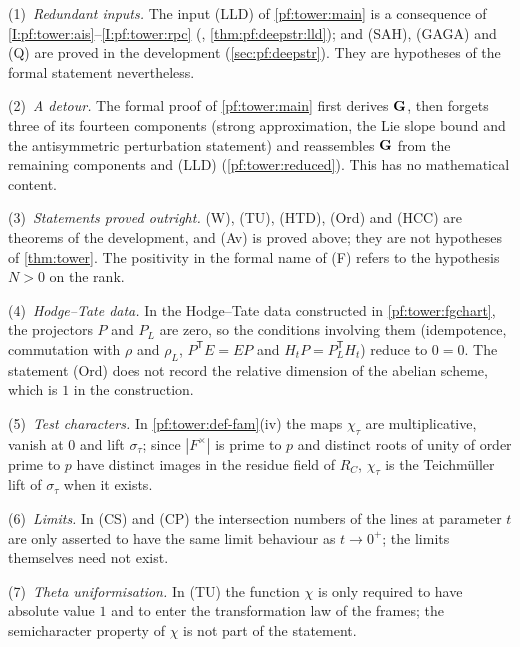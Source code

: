 \begin{remark}\label{pf:tower:rem-formal}
(1)~\emph{Redundant inputs.} The input (LLD) of \cref{pf:tower:main} is a consequence of \ref{I:pf:tower:ais}--\ref{I:pf:tower:rpc}
(, \cref{thm:pf:deepstr:lld}); and (SAH), (GAGA) and (Q)
are proved in the development (\cref{sec:pf:deepstr}). They are hypotheses of the formal statement nevertheless.

(2)~\emph{A detour.} The formal proof of \cref{pf:tower:main} first derives $\mathbf G$, then forgets three of its fourteen components
(strong approximation, the Lie slope bound and the antisymmetric perturbation statement) and reassembles $\mathbf G$ from the
remaining components and (LLD) (\cref{pf:tower:reduced}). This has no mathematical content.

(3)~\emph{Statements proved outright.} (W), (TU), (HTD), (Ord) and (HCC) are theorems of the development, and (Av) is proved
above; they are not hypotheses of \cref{thm:tower}. The positivity in the formal name of (F) refers to the hypothesis $N>0$ on
the rank.

(4)~\emph{Hodge--Tate data.} In the Hodge--Tate data constructed in \cref{pf:tower:fgchart}, the projectors $P$ and $P_L$ are
zero, so the conditions involving them (idempotence, commutation with $\rho$ and $\rho_L$, $P^{\mathsf T}E=EP$ and
$H_tP=P_L^{\mathsf T}H_t$) reduce to $0=0$. The statement (Ord) does not record the relative dimension of the
abelian scheme, which is $1$ in the construction.

(5)~\emph{Test characters.} In \cref{pf:tower:def-fam}(iv) the maps $\chi_\tau$ are multiplicative, vanish at $0$ and lift
$\sigma_\tau$; since $|F^\times|$ is prime to $p$ and distinct roots of unity of order prime to $p$ have distinct images in the
residue field of $R_C$, $\chi_\tau$ is the Teichm\"uller lift of $\sigma_\tau$ when it exists.

(6)~\emph{Limits.} In (CS) and (CP) the intersection numbers of the lines at parameter $t$ are only asserted to have the same
limit behaviour as $t\to0^+$; the limits themselves need not exist.

(7)~\emph{Theta uniformisation.} In (TU) the function $\chi$ is only required to have absolute value $1$ and to enter the
transformation law of the frames; the semicharacter property of $\chi$ is not part of the statement.
\end{remark}
